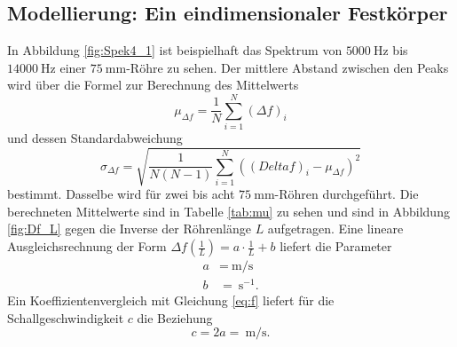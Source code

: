 \subsection{Modellierung: Ein eindimensionaler Festkörper}

In Abbildung \ref{fig:Spek4_1} ist beispielhaft das Spektrum von  $\SI{5000}{\hertz}$ bis $\SI{14000}{\hertz}$ einer $\SI{75}{\milli\meter}$-Röhre zu sehen.
Der mittlere Abstand zwischen den Peaks wird über die Formel zur Berechnung des Mittelwerts
\[
\mu_{\Delta f} = \frac{1}{N}\sum_{i=1}^{N}(\Delta f)_i
\]
und dessen Standardabweichung
\[
\sigma_{\Delta f} = \sqrt{\frac{1}{N(N-1)}\sum_{i=1}^{N}((Delta f)_i-\mu_{\Delta f})^2}
\]
bestimmt. Dasselbe wird für zwei bis acht $\SI{75}{\milli\meter}$-Röhren durchgeführt. Die berechneten Mittelwerte sind in Tabelle
\ref{tab:mu} zu sehen und sind in Abbildung \ref{fig:Df_L} gegen die Inverse der Röhrenlänge $L$ aufgetragen. Eine lineare Ausgleichsrechnung der Form $\Delta f\left(\frac{1}{L}\right)= a\cdot\frac{1}{L}+b$ liefert die Parameter
\begin{align*}
a&=\SI{}{\meter\per\second}\\
b&=\SI{}{\second^{-1}}\text{.}
\end{align*}
Ein Koeffizientenvergleich mit Gleichung \eqref{eq:f} liefert für die Schallgeschwindigkeit $c$ die Beziehung
\[
c=2 a=\SI{}{\meter\per\second}\text{.}
\]

